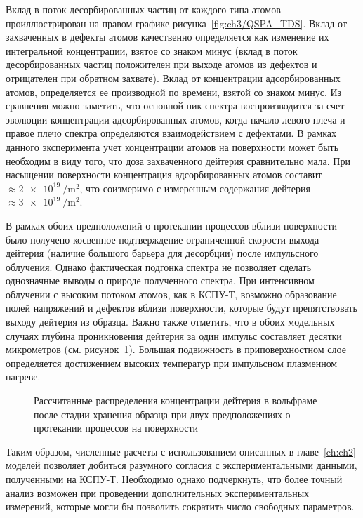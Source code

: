 Вклад в поток десорбированных частиц от каждого типа атомов проиллюстрирован на правом графике рисунка~\cref{fig:ch3/QSPA_TDS}. Вклад от захваченных в дефекты атомов качественно определяется как изменение их интегральной концентрации, взятое со знаком минус (вклад в поток десорбированных частиц положителен при выходе атомов из дефектов и отрицателен при обратном захвате). Вклад от концентрации адсорбированных атомов, определяется ее производной по времени, взятой со знаком минус. Из сравнения можно заметить, что основной пик спектра воспроизводится за счет эволюции концентрации адсорбированных атомов, когда начало левого плеча и правое плечо спектра определяются взаимодействием с дефектами. В рамках данного эксперимента учет концентрации атомов на поверхности может быть необходим в виду того, что доза захваченного дейтерия сравнительно мала. При насыщении поверхности концентрация адсорбированных атомов составит \( \approx \SI{2e19}{\per\meter\squared} \), что соизмеримо с измеренным содержания дейтерия \( \approx \SI{3e19}{\per\meter\squared}\).

В рамках обоих предположений о протекании процессов вблизи поверхности было получено косвенное подтверждение ограниченной скорости выхода дейтерия (наличие большого барьера для десорбции) после импульсного облучения. Однако фактическая подгонка спектра не позволяет сделать однозначные выводы о природе полученного спектра. При интенсивном облучении с высоким потоком атомов, как в КСПУ-Т, возможно образование полей напряжений и дефектов вблизи поверхности, которые будут препятствовать выходу дейтерия из образца. Важно также отметить, что в обоих модельных случаях глубина проникновения дейтерия за один импульс составляет десятки микрометров (см. рисунок~\cref{fig:ch3/QSPA_conc}). Большая подвижность в приповерхностном слое определяется достижением высоких температур при импульсном плазменном нагреве.
\begin{figure}[ht]
	\caption{Рассчитанные распределения концентрации дейтерия в вольфраме после стадии хранения образца при двух предположениях о протекании процессов на поверхности}\label{fig:ch3/QSPA_conc}
\end{figure}

Таким образом, численные расчеты с использованием описанных в главе~\cref{ch:ch2} моделей позволяет добиться разумного согласия с экспериментальными данными, полученными на КСПУ-Т. Необходимо однако подчеркнуть, что более точный анализ возможен при проведении дополнительных экспериментальных измерений, которые могли бы позволить сократить число свободных параметров.

